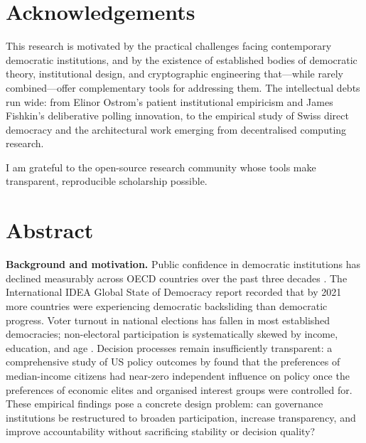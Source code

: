 \documentclass[12pt,a4paper,oneside]{report}
\begin{document}
\chapter*{Acknowledgements}
\thispagestyle{plain}

This research is motivated by the practical challenges facing contemporary democratic institutions, and by the existence of established bodies of democratic theory, institutional design, and cryptographic engineering that---while rarely combined---offer complementary tools for addressing them. The intellectual debts run wide: from Elinor Ostrom's patient institutional empiricism and James Fishkin's deliberative polling innovation, to the empirical study of Swiss direct democracy and the architectural work emerging from decentralised computing research.

I am grateful to the open-source research community whose tools make transparent, reproducible scholarship possible.

\clearpage

\chapter*{Abstract}
\thispagestyle{plain}

\noindent\textbf{Background and motivation.}
Public confidence in democratic institutions has declined measurably across OECD countries over the past three decades \citep{norris2011democratic, dalton2004democratic}. The International IDEA Global State of Democracy report \citep{idea2021global} recorded that by 2021 more countries were experiencing democratic backsliding than democratic progress. Voter turnout in national elections has fallen in most established democracies; non-electoral participation is systematically skewed by income, education, and age \citep{schlozman2012unheavenly}. Decision processes remain insufficiently transparent: a comprehensive study of US policy outcomes by \citet{gilens2014testing} found that the preferences of median-income citizens had near-zero independent influence on policy once the preferences of economic elites and organised interest groups were controlled for. These empirical findings pose a concrete design problem: can governance institutions be restructured to broaden participation, increase transparency, and improve accountability without sacrificing stability or decision quality?
\end{document}
